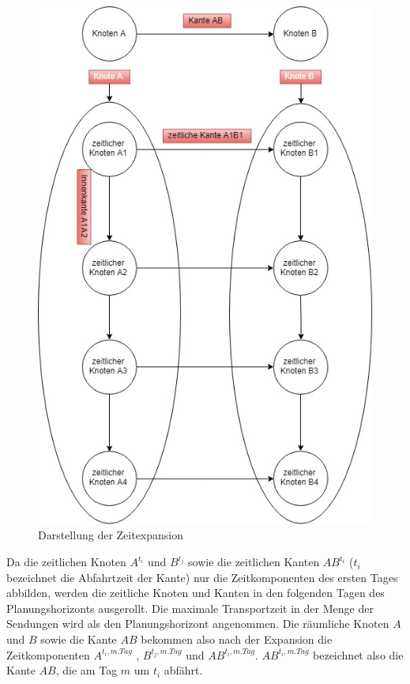 \begin{figure}[ht]
\centering
\includegraphics[scale=0.3]{fotos/timeexpansion.jpg}
\caption{Darstellung der Zeitexpansion}
\end{figure}

Da die zeitlichen Knoten $A^{t_i}$ und $B^{t_j}$ sowie die zeitlichen Kanten $AB^{t_i} $ ($t_i$ bezeichnet die Abfahrtzeit der Kante) nur die Zeitkomponenten des ersten Tages abbilden, werden die zeitliche Knoten und Kanten in den folgenden Tagen des Planungshorizonts ausgerollt. Die maximale Transportzeit in der Menge der Sendungen wird als den Planungshorizont angenommen. Die räumliche Knoten $A$ und $B$ sowie die Kante $AB$ bekommen also nach der Expansion die Zeitkomponenten $A^{t_i, m. Tag}$ , $B^{t_j, m. Tag}$ und $AB^{t_i, m. Tag}$. $AB^{t_i, m. Tag}$ bezeichnet also die Kante $AB$, die am Tag $m$ um $t_i$ abfährt.\\

